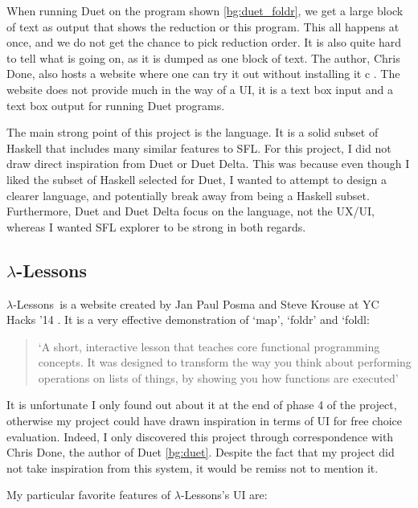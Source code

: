 \noindent When running Duet \cite{duet_hackage} on the program shown \ref{bg:duet_foldr}, we get a large block of text as output that shows the reduction or this program. This all happens at once, and we do not get the chance to pick reduction order. It is also quite hard to tell what is going on, as it is dumped as one block of text. The author, Chris Done, also hosts a website where one can try it out without installing it c \cite{duet_delta}. The website does not provide much in the way of a UI, it is a text box input and a text box output for running Duet programs.

The main strong point of this project is the language. It is a solid subset of Haskell that includes many similar features to SFL. For this project, I did not draw direct inspiration from Duet or Duet Delta. This was because even though I liked the subset of Haskell selected for Duet, I wanted to attempt to design a clearer language, and potentially break away from being a Haskell subset. Furthermore, Duet and Duet Delta focus on the language, not the UX/UI, whereas I wanted SFL explorer to be strong in both regards. 

\subsection{$\lambda$-Lessons}
\newcommand{\llessons}{$\lambda$-Lessons}

\llessons\ is a website created by Jan Paul Posma and Steve Krouse at YC Hacks '14 \cite{lambdalessons}. It is a very effective demonstration of `map', `foldr' and `foldl:

\begin{quotation}
`A short, interactive lesson that teaches core functional programming concepts. It was designed to transform the way you think about performing operations on lists of things, by showing you how functions are executed' \cite{lambdalessons}
\end{quotation}

\noindent It is unfortunate I only found out about it at the end of phase 4 of the project, otherwise my project could have drawn inspiration in terms of UI for free choice evaluation. Indeed, I only discovered this project through correspondence with Chris Done, the author of Duet \ref{bg:duet}. Despite the fact that my project did not take inspiration from this system, it would be remiss not to mention it. 

My particular favorite features of \llessons's UI are:

